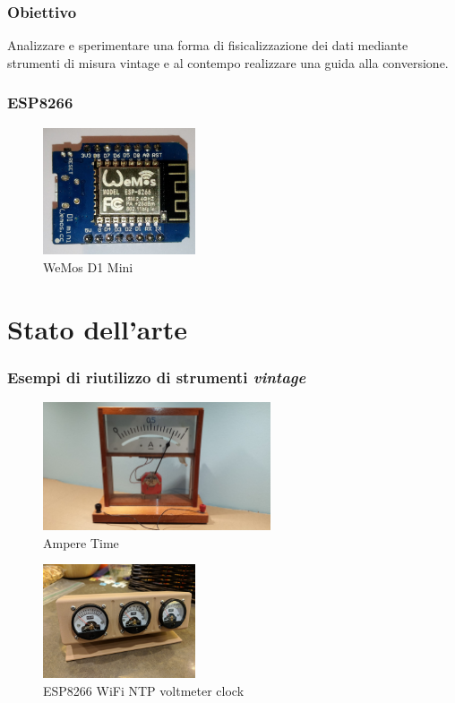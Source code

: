 \documentclass[aspectratio=169]{beamer}
\begin{document}
\begin{frame}
\frametitle{Obiettivo}
Analizzare e sperimentare una forma di fisicalizzazione dei dati mediante strumenti di misura vintage e al contempo realizzare una guida alla conversione.

\end{frame}

\begin{frame}
\frametitle{ESP8266}
\begin{figure}[h]
  \centering
  \includegraphics[width=0.4\textwidth]{wd1mini}
  \caption{WeMos D1 Mini\autocite{wiki:wd1mini}}
\end{figure}

\end{frame}

\section{Stato dell'arte}

\begin{frame}[allowframebreaks]
\frametitle{Esempi di riutilizzo di strumenti \textit{vintage}}
\begin{figure}[h]
  \centering
  \includegraphics[width=0.6\textwidth]{amperetime}
  \caption{Ampere Time\autocite{amperetime}}
\end{figure}

\framebreak

\begin{figure}[h]
  \centering
  \includegraphics[width=0.4\textwidth]{voltclock}
  \caption{ESP8266 WiFi NTP voltmeter clock\autocite{voltclock}}
\end{figure}
\end{frame}
\end{document}
